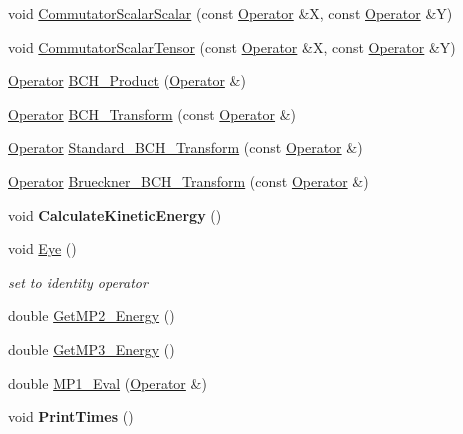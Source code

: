 \begin{DoxyCompactItemize}
\item 
void \hyperlink{classOperator_a93daa0fe076a64408773a65d66c6f14d}{Commutator\+Scalar\+Scalar} (const \hyperlink{classOperator}{Operator} \&X, const \hyperlink{classOperator}{Operator} \&Y)
\item 
void \hyperlink{classOperator_a07b286db306e5bb11c6d897bc3a199c8}{Commutator\+Scalar\+Tensor} (const \hyperlink{classOperator}{Operator} \&X, const \hyperlink{classOperator}{Operator} \&Y)
\item 
\hyperlink{classOperator}{Operator} \hyperlink{classOperator_a6a91cd02db723ee28b7532e6af029033}{B\+C\+H\+\_\+\+Product} (\hyperlink{classOperator}{Operator} \&)
\item 
\hyperlink{classOperator}{Operator} \hyperlink{classOperator_a9a2d6b13d851f2655f3ef88033a24c5b}{B\+C\+H\+\_\+\+Transform} (const \hyperlink{classOperator}{Operator} \&)
\item 
\hyperlink{classOperator}{Operator} \hyperlink{classOperator_a9deea6699c1d3d39119bedeb1f53965e}{Standard\+\_\+\+B\+C\+H\+\_\+\+Transform} (const \hyperlink{classOperator}{Operator} \&)
\item 
\hyperlink{classOperator}{Operator} \hyperlink{classOperator_a088a5326a1c82e520b8bcdd4dc25175a}{Brueckner\+\_\+\+B\+C\+H\+\_\+\+Transform} (const \hyperlink{classOperator}{Operator} \&)
\item 
void {\bfseries Calculate\+Kinetic\+Energy} ()\hypertarget{classOperator_a701c64f8be794e89fd28a643b56d534a}{}\label{classOperator_a701c64f8be794e89fd28a643b56d534a}

\item 
void \hyperlink{classOperator_a03a378f0da2fe71d8160bd3262891457}{Eye} ()\hypertarget{classOperator_a03a378f0da2fe71d8160bd3262891457}{}\label{classOperator_a03a378f0da2fe71d8160bd3262891457}

\begin{DoxyCompactList}\small\item\em set to identity operator \end{DoxyCompactList}\item 
double \hyperlink{classOperator_ad7639b562a3df5215000677b1dc499e6}{Get\+M\+P2\+\_\+\+Energy} ()
\item 
double \hyperlink{classOperator_ac12117e2c500dff8ab5d532573793290}{Get\+M\+P3\+\_\+\+Energy} ()
\item 
double \hyperlink{classOperator_a85d082bf283e568e1dd5bce4dc362d41}{M\+P1\+\_\+\+Eval} (\hyperlink{classOperator}{Operator} \&)
\item 
void {\bfseries Print\+Times} ()\hypertarget{classOperator_aa8280e8e2c6be73a9594789127b939c1}{}\label{classOperator_aa8280e8e2c6be73a9594789127b939c1}


\end{DoxyCompactItemize}
